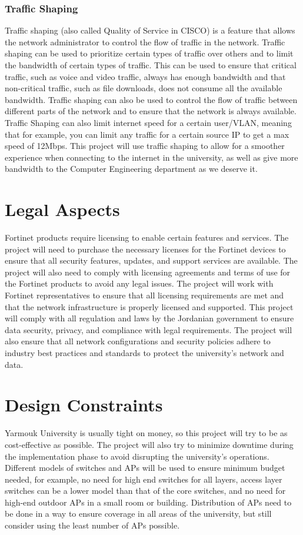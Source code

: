 \documentclass[12pt]{report}
\begin{document}
\subsubsection{Traffic Shaping}
Traffic shaping (also called Quality of Service in CISCO) is a feature that allows the network administrator to control the flow of traffic in the network. Traffic shaping can be used to prioritize certain types of traffic over others and to limit the bandwidth of certain types of traffic. This can be used to ensure that critical traffic, such as voice and video traffic, always has enough bandwidth and that non-critical traffic, such as file downloads, does not consume all the available bandwidth. Traffic shaping can also be used to control the flow of traffic between different parts of the network and to ensure that the network is always available. Traffic Shaping can also limit internet speed for a certain user/VLAN, meaning that for example, you can limit any traffic for a certain source IP to get a max speed of 12Mbps. This project will use traffic shaping to allow for a smoother experience when connecting to the internet in the university, as well as give more bandwidth to the Computer Engineering department as we deserve it. %
\section{Legal Aspects}
Fortinet products require licensing to enable certain features and services. The project will need to purchase the necessary licenses for the Fortinet devices to ensure that all security features, updates, and support services are available. The project will also need to comply with licensing agreements and terms of use for the Fortinet products to avoid any legal issues. The project will work with Fortinet representatives to ensure that all licensing requirements are met and that the network infrastructure is properly licensed and supported.
This project will comply with all regulation and laws by the Jordanian government to ensure data security, privacy, and compliance with legal requirements. The project will also ensure that all network configurations and security policies adhere to industry best practices and standards to protect the university's network and data.
\section{Design Constraints}
Yarmouk University is usually tight on money, so this project will try to be as cost-effective as possible. The project will also try to minimize downtime during the implementation phase to avoid disrupting the university's operations. Different models of switches and APs will be used to ensure minimum budget needed, for example, no need for high end switches for all layers, access layer switches can be a lower model than that of the core switches, and no need for high-end outdoor APs in a small room or building. Distribution of APs need to be done in a way to ensure coverage in all areas of the university, but still consider using the least number of APs possible.
\end{document}
